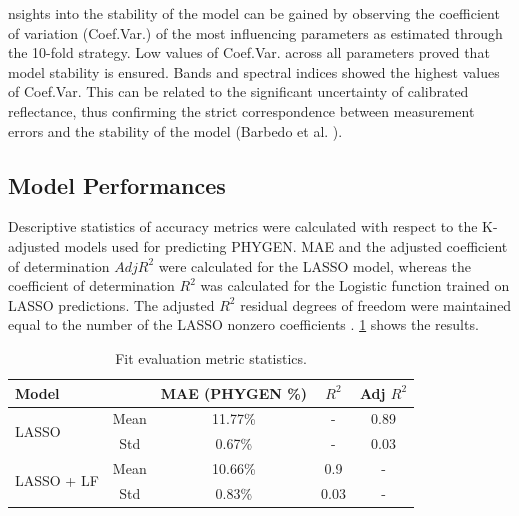 \documentclass[12pt,a4paper,oneside]{report}
\begin{document}
nsights into the stability of the model can be gained by observing the coefficient of variation (Coef.Var.) of the most influencing parameters as estimated through the 10-fold strategy. Low values of Coef.Var. across all parameters proved that model stability is ensured. Bands and spectral indices showed the highest values of Coef.Var. This can be related to the significant uncertainty of calibrated reflectance, thus confirming the strict correspondence between measurement errors and the stability of the model (Barbedo et al.
\cite{barbedoDeepLearningApplied2022}).

\subsection{Model Performances}

Descriptive statistics of accuracy metrics were calculated with respect to the K-adjusted models used for predicting PHYGEN. MAE and the adjusted coefficient of determination $Adj R^2$ were calculated for the LASSO model, whereas the coefficient of determination $R^2$ was calculated for the Logistic function trained on LASSO predictions. The adjusted $R^2$ residual degrees of freedom were maintained equal to the number of the LASSO nonzero coefficients
\cite{zouDegreesFreedomLasso2007}. \cref{tab:metrics} shows the results.

\begin{table}[H]
    \centering
    \caption{Fit evaluation metric statistics.}
    \begin{tabular}{lcccc}
    \toprule
    \textbf{Model} & \textbf{} & \textbf{MAE (PHYGEN \%)} & \textbf{$R^2$} & \textbf{Adj $R^2$} \\
    \midrule
    \multirow{2}{*}{LASSO} & Mean & 11.77\% & - & 0.89 \\
    & Std & 0.67\% & - & 0.03 \\
    \midrule
    \multirow{2}{*}{LASSO + LF} & Mean & 10.66\% & 0.9 & - \\
    & Std & 0.83\% & 0.03 & - \\
    \bottomrule
    \end{tabular}
    \label{tab:metrics}
\end{table}
\end{document}
